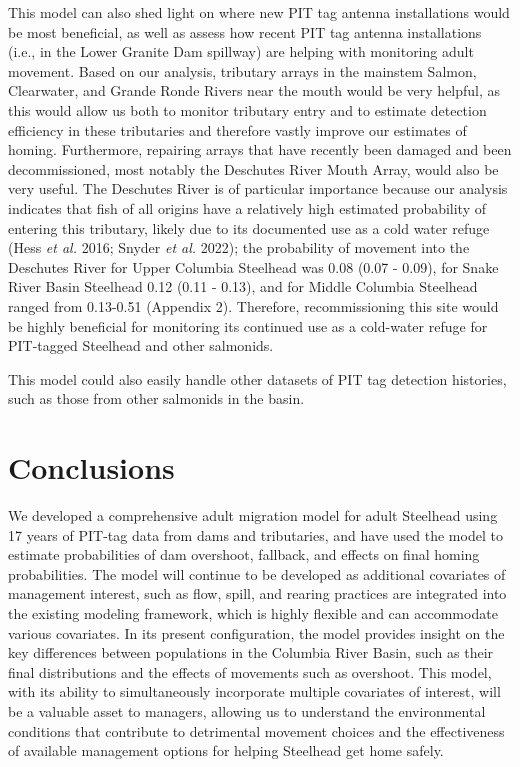 \documentclass[
  12pt,
]{report}
\begin{document}
This model can also shed light on where new PIT tag antenna
installations would be most beneficial, as well as assess how recent PIT
tag antenna installations (i.e., in the Lower Granite Dam spillway) are
helping with monitoring adult movement. Based on our analysis, tributary
arrays in the mainstem Salmon, Clearwater, and Grande Ronde Rivers near
the mouth would be very helpful, as this would allow us both to monitor
tributary entry and to estimate detection efficiency in these
tributaries and therefore vastly improve our estimates of homing.
Furthermore, repairing arrays that have recently been damaged and been
decommissioned, most notably the Deschutes River Mouth Array, would also
be very useful. The Deschutes River is of particular importance because
our analysis indicates that fish of all origins have a relatively high
estimated probability of entering this tributary, likely due to its
documented use as a cold water refuge (Hess \emph{et al.} 2016; Snyder
\emph{et al.} 2022); the probability of movement into the Deschutes
River for Upper Columbia Steelhead was 0.08 (0.07 - 0.09), for Snake
River Basin Steelhead 0.12 (0.11 - 0.13), and for Middle Columbia
Steelhead ranged from 0.13-0.51 (Appendix 2). Therefore, recommissioning
this site would be highly beneficial for monitoring its continued use as
a cold-water refuge for PIT-tagged Steelhead and other salmonids.

This model could also easily handle other datasets of PIT tag detection
histories, such as those from other salmonids in the basin.

\hypertarget{conclusions}{%
\chapter{Conclusions}\label{conclusions}}

We developed a comprehensive adult migration model for adult Steelhead
using 17 years of PIT-tag data from dams and tributaries, and have used
the model to estimate probabilities of dam overshoot, fallback, and
effects on final homing probabilities. The model will continue to be
developed as additional covariates of management interest, such as flow,
spill, and rearing practices are integrated into the existing modeling
framework, which is highly flexible and can accommodate various
covariates. In its present configuration, the model provides insight on
the key differences between populations in the Columbia River Basin,
such as their final distributions and the effects of movements such as
overshoot. This model, with its ability to simultaneously incorporate
multiple covariates of interest, will be a valuable asset to managers,
allowing us to understand the environmental conditions that contribute
to detrimental movement choices and the effectiveness of available
management options for helping Steelhead get home safely.
\end{document}
